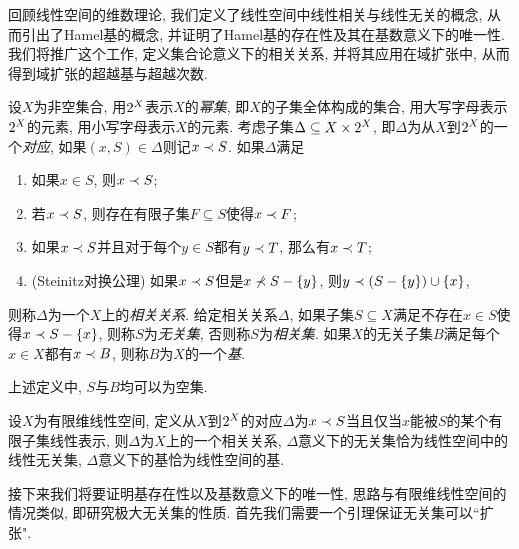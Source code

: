 
回顾线性空间的维数理论, 我们定义了线性空间中线性相关与线性无关的概念, 从而引出了Hamel基的概念, 并证明了\parencite[44--46, Section 2.1]{ciarlet_linear_2013}Hamel基的存在性\footnotemark 及其在基数意义下的唯一性. 我们将推广这个工作, 定义集合论意义下的相关关系, 并将其应用在域扩张中, 从而得到域扩张的超越基与超越次数.

设$X$为非空集合, 用$2^{X}$表示$X$的\emph{幂集}, 即$X$的子集全体构成的集合, 用大写字母表示$2^{X}$的元素, 用小写字母表示$X$的元素. 考虑子集$\Delta\subseteq X\times 2^{X}$, 即$\Delta$为从$X$到$2^{X}$的一个\emph{对应}, 如果$(x, S)\in \Delta$则记$x\prec S$. 如果$\Delta$满足
\begin{enumerate}\label{enum:dependaxiom}
    \item\label{enum:dependaxiom1} 如果$x\in S$, 则$x\prec S$;
    \item\label{enum:dependaxiom2} 若$x\prec S$, 则存在有限子集$F\subseteq S$使得$x\prec F$;
    \item\label{enum:dependaxiom3} 如果$x\prec S$并且对于每个$y\in S$都有$y\prec T$, 那么有$x\prec T$;
    \item\label{enum:dependaxiom4} (Steinitz对换公理) 如果$x\prec S$但是$x\nprec S-\{y\}$, 则$y\prec (S-\{y\})\cup\{x\}$,
\end{enumerate}
则称$\Delta$为一个$X$上的\emph{相关关系}. 给定相关关系$\Delta$, 如果子集$S\subseteq X$满足不存在$x\in S$使得$x\prec S-\{x\}$, 则称$S$为\emph{无关集}, 否则称$S$为\emph{相关集}. 如果$X$的无关子集$B$满足每个$x\in X$都有$x\prec B$, 则称$B$为$X$的一个\emph{基}.

\begin{remark}
    上述定义中, $S$与$B$均可以为空集.
\end{remark}

\begin{example}
    设$X$为有限维线性空间, 定义从$X$到$2^{X}$的对应$\Delta$为$x\prec S$当且仅当$x$能被$S$的某个有限子集线性表示, 则$\Delta$为$X$上的一个相关关系, $\Delta$意义下的无关集恰为线性空间中的线性无关集, $\Delta$意义下的基恰为线性空间的基.
\end{example}

接下来我们将要证明基存在性以及基数意义下的唯一性, 思路与有限维线性空间的情况类似, 即研究极大无关集的性质. 首先我们需要一个引理保证无关集可以``扩张".

